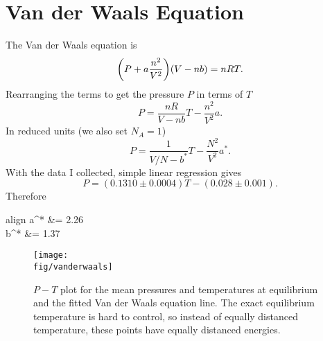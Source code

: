 \documentclass[12pt,a4paper]{article}
\newcommand{\fig}{../fig}
\begin{document}
	\section{Van der Waals Equation}
	The Van der Waals equation is
	\begin{equation}
		\qty(P + a\frac{n^2}{V^2})(V-nb) = nRT.
	\end{equation}
	Rearranging the terms to get the pressure $P$ in terms of $T$
	\begin{equation}
		P = \frac{nR}{V-nb}T - \frac{n^2}{V^2}a.
	\end{equation}
	In reduced units (we also set $N_A = 1$)
	\begin{equation}
		P = \frac{1}{V/N-b^*}T - \frac{N^2}{V^2}a^*.
	\end{equation}
	With the data I collected, simple linear regression gives 
	\begin{equation}
		P = (0.1310 \pm 0.0004)T - (0.028 \pm 0.001).
	\end{equation}
	Therefore
	\begin{empheq}[left=\empheqlbrace]{align}
		a^* &= 2.26  \\
		b^* &= 1.37 
	\end{empheq}
	\begin{figure}[htb!]
		\centering
		\texttt{[image: \\fig/vanderwaals]}
		\caption{$P-T$ plot for the mean pressures and temperatures at equilibrium and the fitted Van der Waals
			equation line. The exact equilibrium temperature is hard to control, so instead of equally distanced
			temperature, these points have equally distanced energies.}
	\end{figure}
\end{document}
